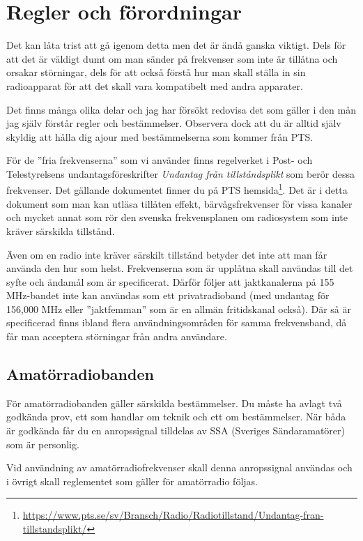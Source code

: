 \chapter{Regler och förordningar}

Det kan låta trist att gå igenom detta men det är ändå ganska viktigt. Dels för att det är väldigt dumt om man sänder på frekvenser som inte är tillåtna och orsakar störningar, dels för att också förstå hur man skall ställa in sin radioapparat för att det skall vara kompatibelt med andra apparater.

Det finns många olika delar och jag har försökt redovisa det som gäller i den mån jag själv förstår regler och bestämmelser. Observera dock att du är alltid själv skyldig att hålla dig ajour med bestämmelserna som kommer från PTS.

För de ''fria frekvenserna'' som vi använder finns regelverket i Post- och Telestyrelsens undantagsföreskrifter \textit{Undantag från tillståndsplikt} som berör dessa frekvenser. Det gällande dokumentet finner du på PTS hemsida\footnote{\url{https://www.pts.se/sv/Bransch/Radio/Radiotillstand/Undantag-fran-tillstandsplikt/}}. Det är i detta dokument som man kan utläsa tillåten effekt, bärvågsfrekvenser för vissa kanaler och mycket annat som rör den svenska frekvensplanen om radiosystem som inte kräver särskilda tillstånd.

Även om en radio inte kräver särskilt tillstånd betyder det inte att man får använda den hur som helst. Frekvenserna som är upplåtna skall användas till det syfte och ändamål som är specificerat. Därför följer att jaktkanalerna på 155 MHz-bandet inte kan användas som ett privatradioband (med undantag för 156,000 MHz eller ''jaktfemman'' som är en allmän fritidskanal också). Där så är specificerad finns ibland flera användningsområden för samma frekvensband, då får man acceptera störningar från andra användare. 

\section{Amatörradiobanden}

För amatörradiobanden gäller särskilda bestämmelser. Du måste ha avlagt två godkända prov, ett som handlar om teknik och ett om bestämmelser. När båda är godkända får du en anropssignal tilldelas av SSA (Sveriges Sändaramatörer) som är personlig.

Vid användning av amatörradiofrekvenser skall denna anropssignal användas och i övrigt skall reglementet som gäller för amatörradio följas. 

